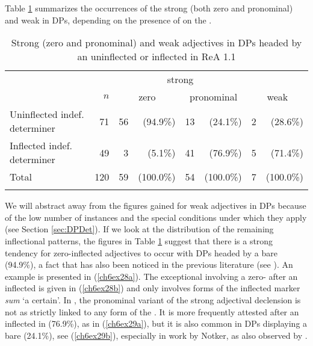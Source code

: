 \documentclass[output=paper,colorlinks,citecolor=brown]{langscibook}
\begin{document}
Table \ref{ch6t2} summarizes the occurrences of the strong (both zero and
pronominal) and weak  in  DPs, depending on the
presence of  on the .

\begin{table}
\begin{tabular}{l r *3{r@{~}r}}
\lsptoprule 
                              &     & \multicolumn{4}{c}{strong}                                  &  \\\cmidrule(lr){3-6}
                              & $n$ & \multicolumn{2}{c}{zero}   & \multicolumn{2}{c}{pronominal} & \multicolumn{2}{c}{weak} \\\midrule  
Uninflected indef. determiner & 71  & 56 & (94.9\%)             & 13 & (24.1\%)                  & 2 & (28.6\%)\\
Inflected indef. determiner   & 49  & 3  & (5.1\%)              & 41 & (76.9\%)                  & 5 & (71.4\%) \\ 
Total                         & 120 & 59 & (100.0\%)            & 54 & (100.0\%)                 & 7 & (100.0\%) \\ \lspbottomrule
\end{tabular}
\caption{Strong (zero and pronominal) and weak adjectives in DPs headed
by an uninflected or inflected   in ReA 1.1}\label{ch6t2}
\end{table}

We will abstract away from the figures gained for weak adjectives in
 DPs because of the low number of instances and the special
conditions under which they apply (see Section \ref{sec:DPDet}). If we look at the
distribution of the remaining inflectional patterns, the figures in
Table \ref{ch6t2} suggest that there is a strong tendency for zero-inflected
adjectives to occur with DPs headed by a bare  
(94.9\%), a fact that has also been noticed in the previous literature
(see \citealp[205]{klein2007semantischen}). An example is presented in (\ref{ch6ex28a}). The exceptional
 involving a zero- after an inflected  is
given in (\ref{ch6ex28b}) and only involves forms of the inflected 
marker \emph{sum} `a certain'. In , the pronominal variant of
the strong adjectival declension is not as strictly linked to any form
of the . It is more frequently attested after an inflected
in (76.9\%), as in (\ref{ch6ex29a}), but it is also common in
 DPs displaying a bare  (24.1\%), see (\ref{ch6ex29b}),
especially in work by Notker, as also observed by \citet[205]{klein2007semantischen}.
\end{document}
